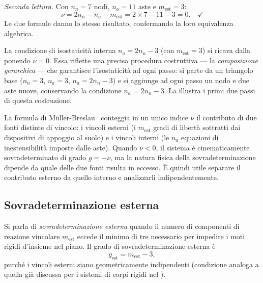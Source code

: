 \noindent\textit{Seconda lettura.}
Con $n_n = 7$ nodi, $n_a = 11$ aste e
$m_{\text{est}} = 3$:
\[
\nu = 2n_n - n_a - m_{\text{est}}
= 2 \times 7 - 11 - 3 = 0. \quad\checkmark
\]
Le due formule danno lo stesso risultato,
confermando la loro equivalenza algebrica.



\begin{oss}\label{oss:composizione_gerarchica}
	La condizione di isostaticità interna
	$n_a = 2n_n - 3$ (con $m_{\text{est}} = 3$)
	si ricava dalla~
	ponendo $\nu = 0$. Essa riflette una precisa
	procedura costruttiva --- la
	\emph{composizione gerarchica} --- che garantisce
	l'isostaticità ad ogni passo: si parte da un
	triangolo base ($n_n = 3$, $n_a = 3$,
	$n_a = 2n_n - 3$) e si aggiunge ad ogni passo
	un nodo e due aste nuove, conservando la
	condizione $n_a = 2n_n - 3$.
	La  illustra
	i primi due passi di questa costruzione.



\end{oss}


La formula di M\"{u}ller-Breslau~
conteggia in un unico indice $\nu$ il contributo di
due fonti distinte di vincolo: i vincoli esterni
(i $m_\text{est}$ gradi di libertà sottratti dai
dispositivi di appoggio al suolo) e i vincoli interni
(le $n_a$ equazioni di inestensibilità imposte dalle
aste). Quando $\nu < 0$, il sistema è
cinematicamente sovradeterminato di grado $g = -\nu$,
ma la natura fisica della sovradeterminazione dipende
da quale delle due fonti risulta in eccesso.
È quindi utile separare il contributo esterno da
quello interno e analizzarli indipendentemente.


\subsection{Sovradeterminazione esterna}
\label{subsec:sovradet_est}

Si parla di \emph{sovradeterminazione esterna} quando
il numero di componenti di reazione vincolare
$m_\text{est}$ eccede il minimo di tre necessario
per impedire i moti rigidi d'insieme nel piano.
Il grado di sovradeterminazione esterna è
\begin{equation}\label{eq:g_est}
	g_\text{est} = m_\text{est} - 3,
\end{equation}
purché i vincoli esterni siano geometricamente
indipendenti (condizione analoga a quella già
discussa per i sistemi di corpi rigidi nel
).

